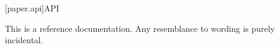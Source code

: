 

[paper.api]{API}

\pnum
This is a reference documentation.
Any resemblance to wording is purely incidental.
